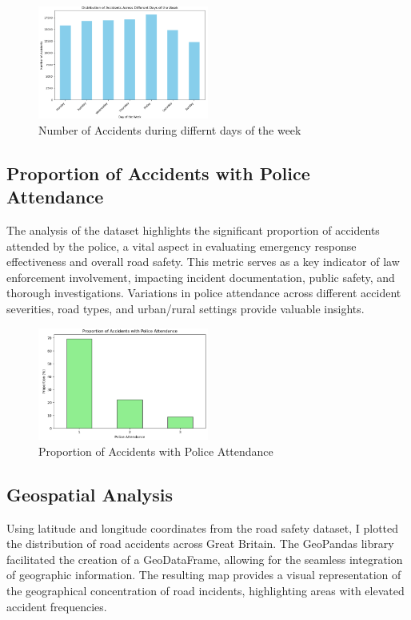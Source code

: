 \documentclass{article}
\begin{document}
\begin{figure}[ht]
  \centering
  \includegraphics[width=0.5\textwidth]{Images/accidents_by_day.png}
  \caption{Number of Accidents during differnt days of the week}
\end{figure}

\subsection{Proportion of Accidents with Police Attendance}
The analysis of the dataset highlights the significant proportion of accidents attended by the police, a vital
aspect in evaluating emergency response effectiveness and overall road safety. This metric serves as a key
indicator of law enforcement involvement, impacting incident documentation, public safety, and thorough
investigations. Variations in police attendance across different accident severities, road types, and
urban/rural settings provide valuable insights.

\begin{figure}[ht]
  \centering
  \includegraphics[width=0.5\textwidth]{Images/police_attendance.png}
  \caption{Proportion of Accidents with Police Attendance}
\end{figure}

\subsection{Geospatial Analysis}
Using latitude and longitude coordinates from the road safety dataset, I plotted the distribution of road accidents
across Great Britain. The GeoPandas library facilitated the creation of a GeoDataFrame, allowing for the seamless
integration of geographic information. The resulting map provides a visual representation of the geographical
concentration of road incidents, highlighting areas with elevated accident frequencies.
\end{document}
